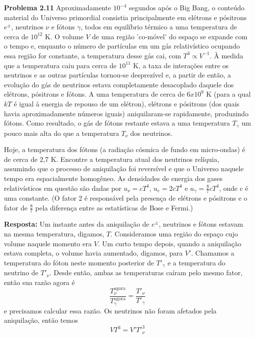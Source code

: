 \documentclass[12pt]{article}
\begin{document}
\textbf{Problema 2.11} Aproximadamente $10^{-4}$ segundos após o Big Bang, o conteúdo material do Universo primordial consistia principalmente em elétrons e pósitrons $e^{\pm }$, neutrinos $\nu$ e fótons $\gamma$, todos em equilíbrio térmico a uma temperatura de cerca de $10^{12}$ K. O volume $V$ de uma região 'co-móvel' do espaço se expande com o tempo e, enquanto o número de partículas em um gás relativístico ocupando essa região for constante, a temperatura desse gás cai, com $T^3 \propto V^{-1}$. À medida que a temperatura caiu para cerca de $10^{11}$ K, a taxa de interações entre os neutrinos e as outras partículas tornou-se desprezível e, a partir de então, a evolução do gás de neutrinos estava completamente desacoplado daquele dos elétrons, pósitrons e fótons. A uma temperatura de cerca de $6 x 10^{9}$ K (para a qual $kT$ é igual à energia de repouso de um elétron), elétrons e pósitrons (dos quais havia aproximadamente números iguais) aniquilaram-se rapidamente, produzindo fótons. Como resultado, o gás de fótons restante estava a uma temperatura $T_\gamma$ um pouco mais alta do que a temperatura $T_\nu$ dos neutrinos.

Hoje, a temperatura dos fótons (a radiação cósmica de fundo em micro-ondas) é de cerca de 2,7 K. Encontre a temperatura atual dos neutrinos relíquia, assumindo que o processo de aniquilação foi reversível e que o Universo naquele tempo era espacialmente homogêneo. As densidades de energia dos gases relativísticos em questão são dadas por $u_\nu = cT^4$, $u_e = 2cT^4$ e $u_\gamma = \frac{8}{7}cT^4$, onde c é uma constante. (O fator 2 é responsável pela presença de elétrons e pósitrons e o fator de $\frac{8}{7}$ pela diferença entre as estatísticas de Bose e Fermi.)

\textbf{Resposta:} Um instante antes da aniquilação de $e^{\pm }$, neutrinos e fótons estavam na mesma temperatura, digamos, $T$. Consideramos uma região do espaço cujo volume naquele momento era $V$. Um curto tempo depois, quando a aniquilação estava completa, o volume havia aumentado, digamos, para $V'$. Chamamos a temperatura do fóton neste momento posterior de $T'_\gamma$ e a temperatura do neutrino de $T'_\nu$. Desde então, ambas as temperaturas caíram pelo mesmo fator, então sua razão agora é
\[
\frac{T^\text{agora}_\nu}{T^\text{agora}_\gamma}=\frac{T'_\nu}{T'_\gamma}
\]
 e precisamos calcular essa razão.
 Os neutrinos não foram afetados pela aniquilação, então temos
\[
V T^3 = V' T'^3_\nu
\]
\end{document}
